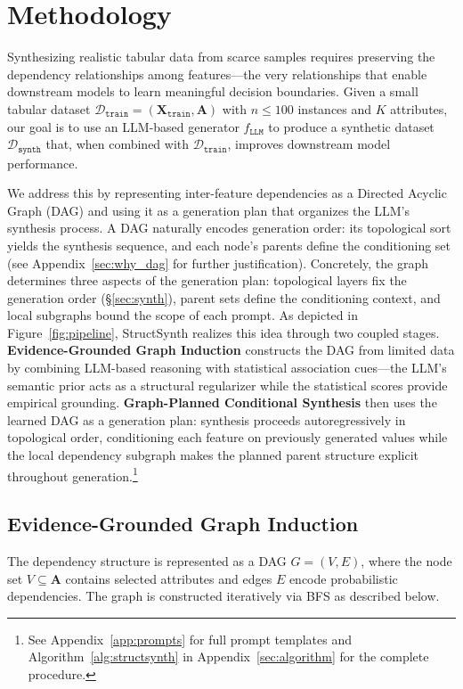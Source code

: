 \section{Methodology}

Synthesizing realistic tabular data from scarce samples requires preserving the dependency relationships among features---the very relationships that enable downstream models to learn meaningful decision boundaries.
Given a small tabular dataset $\mathcal{D}_{\mathtt{train}} = (\mathbf{X}_{\mathtt{train}}, \mathbf{A})$ with $n \le 100$ instances and $K$ attributes, our goal is to use an LLM-based generator $f_{\mathtt{LLM}}$ to produce a synthetic dataset $\mathcal{D}_{\mathtt{synth}}$ that, when combined with $\mathcal{D}_{\mathtt{train}}$, improves downstream model performance.

We address this by representing inter-feature dependencies as a Directed Acyclic Graph (DAG) and using it as a generation plan that organizes the LLM's synthesis process. A DAG naturally encodes generation order: its topological sort yields the synthesis sequence, and each node's parents define the conditioning set (see Appendix~\ref{sec:why_dag} for further justification). Concretely, the graph determines three aspects of the generation plan: topological layers fix the generation order (\S\ref{sec:synth}), parent sets define the conditioning context, and local subgraphs bound the scope of each prompt. As depicted in Figure~\ref{fig:pipeline}, \textsf{StructSynth} realizes this idea through two coupled stages.
\textbf{Evidence-Grounded Graph Induction} constructs the DAG from limited data by combining LLM-based reasoning with statistical association cues---the LLM's semantic prior acts as a structural regularizer while the statistical scores provide empirical grounding.
\textbf{Graph-Planned Conditional Synthesis} then uses the learned DAG as a generation plan: synthesis proceeds autoregressively in topological order, conditioning each feature on previously generated values while the local dependency subgraph makes the planned parent structure explicit throughout generation.\footnote{See Appendix~\ref{app:prompts} for full prompt templates and Algorithm~\ref{alg:structsynth} in Appendix~\ref{sec:algorithm} for the complete procedure.}

\subsection{Evidence-Grounded Graph Induction}

The dependency structure is represented as a DAG $G = (V, E)$, where the node set $V \subseteq \mathbf{A}$ contains selected attributes and edges $E$ encode probabilistic dependencies. The graph is constructed iteratively via BFS as described below.

